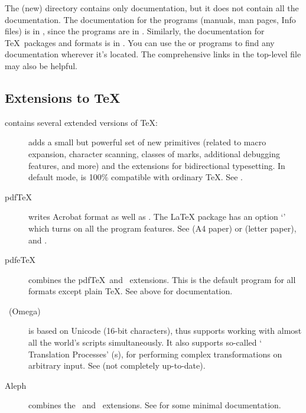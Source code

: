\documentclass{article}
\begin{document}
The (new)  directory contains only documentation, but
it does not contain all the documentation.  The documentation for the
programs (manuals, man pages, Info files) is in ,
since the programs are in .  Similarly, the documentation
for \TeX\ packages and formats is in .  You can
use the  or  programs to find any
documentation wherever it's located.  The comprehensive links in the
top-level file  may also be helpful.


\subsection{Extensions to \protect\TeX}
\label{sec:tex-extensions}

\TL{} contains several extended versions of \TeX:

\begin{description}

\item [\eTeX] adds a small but powerful set of new primitives
\label{text:etex} (related to macro expansion, character scanning,
classes of marks, additional debugging features, and more) and the
\TeXXeT{} extensions for bidirectional typesetting.  In default mode,
\eTeX{} is 100\% compatible with ordinary \TeX. See
.

\item [pdf\TeX] writes Acrobat  format as well as \dvi{}. The
\LaTeX{}  package has an option `'
which turns on all the program features.  See
 (A4 paper) or
 (letter paper), and
.

\item [pdfe\TeX] combines the pdf\TeX\ and \eTeX\ extensions.  This is
the default program for all formats except plain \TeX.
See above for documentation.

\item [\OMEGA\ (Omega)] is based on Unicode (16-bit characters), thus
supports working with almost all the world's scripts simultaneously. It
also supports so-called `\OMEGA{} Translation Processes' (s),
for performing complex transformations on arbitrary input. See
 (not completely up-to-date).

\item [Aleph] combines the \OMEGA\ and \eTeX\ extensions.  
See  for some minimal documentation.

\end{description} 
\end{document}

